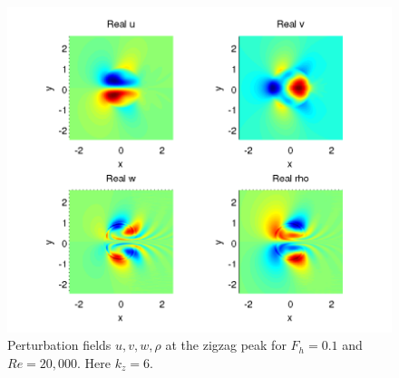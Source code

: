 \begin{figure}
\begin{center}
\includegraphics[width=\textwidth]{velocity_fields_kz_6}
\caption{Perturbation fields $u,v,w,\rho$ at the zigzag peak for $F_{h}=0.1$ and $Re=20{,}000$. Here $k_{z}=6$.}
\end{center}
\label{zigzag_fields}
\end{figure} 

